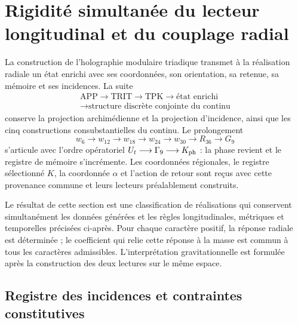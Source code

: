 \section{Rigidité simultanée du lecteur longitudinal et du couplage radial}
\label{g26:sec:rigidez-radial-es}

La construction de l'holographie modulaire triadique transmet à la réalisation
radiale un état enrichi avec ses coordonnées, son orientation, sa retenue,
sa mémoire et ses incidences. La suite
\[
 \begin{gathered}
 \mathrm{APP}\longrightarrow\mathrm{TRIT}\longrightarrow\mathrm{TPK}
 \longrightarrow\text{état enrichi}\\
 \longrightarrow\text{structure discrète conjointe du continu}
 \end{gathered}
\]
conserve la projection archimédienne et la projection d'incidence, ainsi que les cinq constructions consubstantielles du continu. Le prolongement
\[
 w_6\longrightarrow w_{12}\longrightarrow w_{18}\longrightarrow
 w_{24}\longrightarrow w_{30}\longrightarrow R_{36}\longrightarrow G_9
\]
s'articule avec l'ordre opératoriel
\(U_t\longrightarrow\Gamma_9\longrightarrow K_{\rm ph}\) : la phase revient
et le registre de mémoire s'incrémente. Les coordonnées régionales, le
registre sélectionné \(K\), la coordonnée \(\alpha\) et l'action de retour
sont reçus avec cette provenance commune et leurs lecteurs préalablement
construits.

Le résultat de cette section est une classification de réalisations qui conservent simultanément les données générées et les règles longitudinales, métriques et temporelles précisées ci-après. Pour chaque caractère positif, la réponse radiale est déterminée ; le coefficient qui relie cette réponse à la masse est commun à tous les caractères admissibles. L'interprétation gravitationnelle est formulée après la construction des deux lectures sur le même espace.

\subsection{Registre des incidences et contraintes constitutives}

